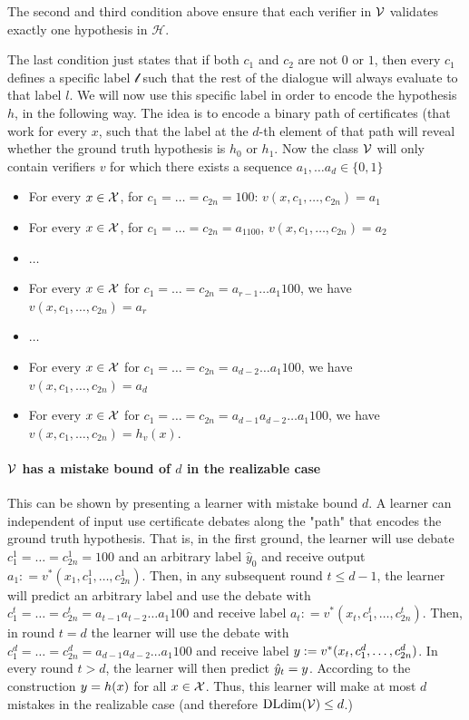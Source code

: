 \documentclass[anon]{alt2027} %
\begin{document}
    The second and third condition above ensure that each verifier in ${\mathcal V}$ validates exactly one hypothesis in $\mathcal{H}$.
    
    The last condition just states that if both $c_1$ and $c_2$ are not $0$ or $1$, then every $c_1$ defines a specific label $\mathcal{l}$ such that the rest of the dialogue will always evaluate to that label $l$.
    We will now use this specific label in order to encode the hypothesis $h$, in the following way.
    The idea is to encode a binary path of certificates (that work for every $x$, such that the label at the $d$-th element of that path will reveal whether the ground truth hypothesis is $h_0$ or $h_1$.
    Now the class ${\mathcal V}$ will only contain verifiers $v$ for which there exists a sequence $a_1, \dots a_d \in \{0,1\}$
    \begin{itemize}
        \item For every $x\in {\mathcal X}$, for $c_1 = \dots =c_{2n} = 100$: $v(x, c_1, \dots, c_{2n}) = a_1$
        \item For every $x\in {\mathcal X}$, for $c_1 = \dots =c_{2n} = a_1100$, $v(x, c_1, \dots, c_{2n}) = a_2$
        \item $\dots$
        \item For every $x \in {\mathcal X}$ for $c_1 = \dots = c_{2n} = a_{r-1} \dots a_1 1 00$, we have $v(x, c_1, \dots, c_{2n}) = a_r$
        \item $\dots$
        \item For every $x \in {\mathcal X}$ for $c_1 = \dots = c_{2n} = a_{d-2} \dots a_1 1 00$, we have $v(x, c_1, \dots, c_{2n}) = a_d$
        \item For every $x \in {\mathcal X}$ for $c_1 = \dots = c_{2n} = a_{d-1} a_{d-2} \dots a_1 1 00$, we have $v(x, c_1, \dots, c_{2n}) = h_v(x)$.
    \end{itemize}
    \paragraph{${\mathcal V}$ has a mistake bound of $d$ in the realizable case} This can be shown by presenting a learner with mistake bound $d$. A learner can independent of input use certificate debates along the "path" that encodes the ground truth hypothesis. That is, in the first ground, the learner will use debate $c_1^1 = \dots = c_{2n}^1 = {100}$ and an arbitrary label $\hat{y}_0$ and receive output $a_1 : = v^* (x_1, c_1^1, \dots, c_{2n}^1)$. Then, in any subsequent round $t \leq d-1$, the learner will predict an arbitrary label and use the debate with $c_{1}^t = \dots = c_{2n}^t  = {a_{t-1} a_{t-2} \dots a_1 1 0 0}$ and receive label $a_{t} : = v^*(x_t,c_1^t, \dots, c_{2n}^t )$. 
 Then, in round $t = d $ the learner will use the debate with $c_{1}^d = \dots = c_{2n}^d  = {a_{d-1} a_{d-2} \dots a_1 1 0 0}$ and receive label $y : = v^*(x_t,c_1^d, \dots, c_{2n}^d )$.
 In every round $t > d$, the learner will then predict $\hat{y}_t= y$. According to the construction $y = h(x)$ for all $x\in {\mathcal X}$. Thus, this learner will make at most $d$ mistakes in the realizable case (and therefore  $\mathrm{DLdim}({\mathcal V}) \leq d$.)
\newcommand{\fat}{\textrm{fat}}
\end{document}
